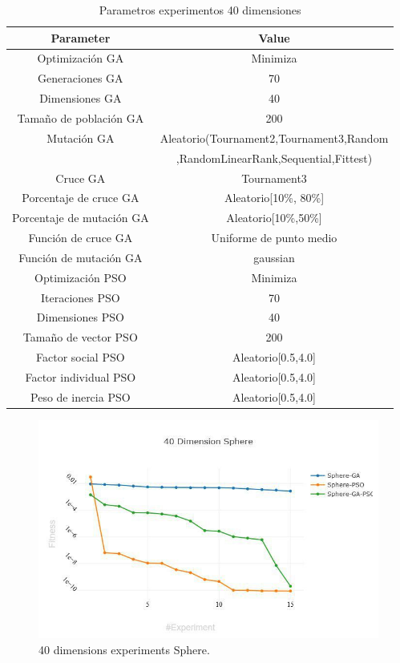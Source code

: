 \documentclass[runningheads]{llncs}
\begin{document}
    \begin{table}[htp]
      \caption{Parametros experimentos 40 dimensiones}
      \label{table:ga-pso-parameters-20}
      \centering
      \begin{tabular}{|c|c|}
      \hline
      Parameter & Value \\
      \hline
      \hline
      Optimizaci\'on GA & Minimiza \\
      \hline
      Generaciones GA & 70 \\
      \hline
      Dimensiones GA & 40 \\
      \hline
      Tama\~no de poblaci\'on GA & 200 \\
      \hline
      Mutaci\'on GA & Aleatorio(Tournament2,Tournament3,Random \\
      &  ,RandomLinearRank,Sequential,Fittest)\\
      \hline
      Cruce GA & Tournament3 \\
      \hline
      Porcentaje de cruce GA & Aleatorio[10\%, 80\%] \\
      \hline
      Porcentaje de mutaci\'on GA & Aleatorio[10\%,50\%] \\
      \hline
      Funci\'on de cruce GA & Uniforme de punto medio \\
      \hline
      Funci\'on de mutaci\'on GA & gaussian \\
      \hline
      Optimizaci\'on PSO & Minimiza \\
      \hline
      Iteraciones PSO & 70 \\
      \hline
      Dimensiones PSO & 40 \\
      \hline
      Tama\~no de vector PSO & 200 \\
      \hline
      Factor social PSO & Aleatorio[0.5,4.0] \\
      \hline
      Factor individual PSO & Aleatorio[0.5,4.0] \\
      \hline
      Peso de inercia PSO & Aleatorio[0.5,4.0] \\
      \hline
      \end{tabular}
      \end{table}
    
      \begin{figure}[htp]
        \includegraphics[width=\textwidth]{40-sphere.jpg}
        \caption{40 dimensions experiments Sphere.} \label{fig1}
        \end{figure}
\end{document}
